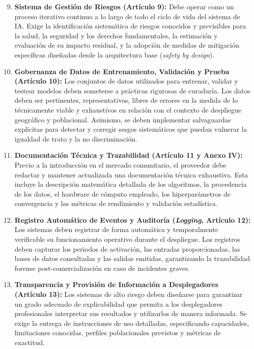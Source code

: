 \begin{enumerate}[label=\textbf{Art. \arabic*.}, leftmargin=3em]
    \setcounter{enumi}{8}
    \item \textbf{Sistema de Gestión de Riesgos (Artículo 9):} Debe operar como un proceso iterativo continuo a lo largo de todo el ciclo de vida del sistema de IA. Exige la identificación sistemática de riesgos conocidos y previsibles para la salud, la seguridad y los derechos fundamentales, la estimación y evaluación de su impacto residual, y la adopción de medidas de mitigación específicas diseñadas desde la arquitectura base (\textit{safety by design}).
    \item \textbf{Gobernanza de Datos de Entrenamiento, Validación y Prueba (Artículo 10):} Los conjuntos de datos utilizados para entrenar, validar y testear modelos deben someterse a prácticas rigurosas de curaduría. Los datos deben ser pertinentes, representativos, libres de errores en la medida de lo técnicamente viable y exhaustivos en relación con el contexto de despliegue geográfico y poblacional. Asimismo, se deben implementar salvaguardas explícitas para detectar y corregir sesgos sistemáticos que puedan vulnerar la igualdad de trato y la no discriminación.
    \item \textbf{Documentación Técnica y Trazabilidad (Artículo 11 y Anexo IV):} Previo a la introducción en el mercado comunitario, el proveedor debe redactar y mantener actualizada una documentación técnica exhaustiva. Esta incluye la descripción matemática detallada de los algoritmos, la procedencia de los datos, el hardware de cómputo empleado, los hiperparámetros de convergencia y las métricas de rendimiento y validación estadística.
    \item \textbf{Registro Automático de Eventos y Auditoría (\textit{Logging}, Artículo 12):} Los sistemas deben registrar de forma automática y temporalmente verificable su funcionamiento operativo durante el despliegue. Los registros deben capturar los periodos de activación, las entradas proporcionadas, las bases de datos consultadas y las salidas emitidas, garantizando la trazabilidad forense post-comercialización en caso de incidentes graves.
    \item \textbf{Transparencia y Provisión de Información a Desplegadores (Artículo 13):} Los sistemas de alto riesgo deben diseñarse para garantizar un grado adecuado de explicabilidad que permita a los desplegadores profesionales interpretar sus resultados y utilizarlos de manera informada. Se exige la entrega de instrucciones de uso detalladas, especificando capacidades, limitaciones conocidas, perfiles poblacionales previstos y métricas de exactitud.

\end{enumerate}
